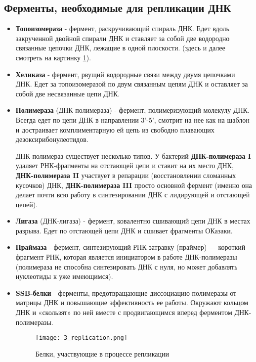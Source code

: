 \subsection{Ферменты, необходимые для репликации ДНК}

\begin{itemize}

    \item \textbf{Топоизомераза} - фермент, раскручивающий спираль ДНК. Едет вдоль закрученной двойной спирали ДНК и ставляет за собой две водородно связанные цепочки ДНК, лежащие в одной плоскости. (здесь и далее смотреть на картинку \ref{fig:3_rep}).
    
    \item \textbf{Хеликаза} - фермент, рвущий водородные связи между двумя цепочками ДНК. Едет за топоизомеразой по двум связанным цепям ДНК и оставляет за собой две несвязанные цепи ДНК.
    
    \item \textbf{Полимераза} (ДНК полимераза) - фермент, полимеризующий молекулу ДНК. Всегда едет по цепи ДНК в направлении 3'-5', смотрит на нее как на шаблон и достраивает комплиментарную ей цепь из свободно плавающих дезоксирибонулеотидов. 
    
    ДНК-полимераз существует несколько типов. У бактерий \textbf{ДНК-полимераза I} удаляет РНК-фрагменты на отстающей цепи и ставит на их место ДНК, \textbf{ДНК-полимераза II} участвует в репарации (восстановлении сломанных кусочков) ДНК, \textbf{ДНК-полимераза III} просто основной фермент (именно она делает почти всю работу в синтезировании ДНК с лидирующей и отстающей цепей).
    
    \item \textbf{Лигаза} (ДНК-лигаза) - фермент, ковалентно сшивающий цепи ДНК в местах разрыва. Едет по отстающей цепи ДНК и сшивает фрагменты ОКазаки. 
    
    \item \textbf{Праймаза} - фермент, синтезирующий РНК-затравку (праймер) — короткий фрагмент РНК, которая является инициатором в работе ДНК-полимеразы (полимераза не способна синтезировать ДНК с нуля, но может добавлять нуклеотиды к уже имеющимся). 
    
    \item \textbf{SSB-белки} - ферменты, предотвращающие диссоциацию полимеразы от матрицы ДНК и повышающие эффективность ее работы. Окружают кольцом ДНК и «скользят» по ней вместе с продвигающимся вперед ферментом ДНК-полимеразы. 
    
    \begin{figure}[h!]
        \centering
        \texttt{[image: 3\_replication.png]}
        \caption{Белки, участвующие в процессе репликации}
        \label{fig:3_rep}
    \end{figure}
    
\end{itemize}

